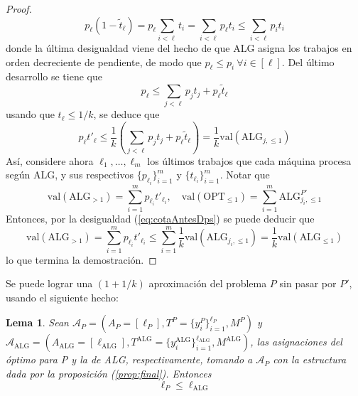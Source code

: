 \documentclass[10pt]{article}
\newcommand{\val}[1]{\text{val}(#1)}
\theoremstyle{plain}
\newtheorem{lem}{Lema}
\theoremstyle{definition}
\begin{document}
\begin{proof}
\begin{equation*}
 p_\ell(1-\tilde{t}_\ell) = p_\ell\sum_{i < \ell} t_i = \sum_{i < \ell} p_\ell t_i \leq  \sum_{i < \ell} p_i t_i
\end{equation*}
donde la última desigualdad viene del hecho de que ALG asigna los trabajos en orden decreciente de pendiente, de modo que $p_\ell \leq p_i \ \forall i \in [\ell]$. Del último desarrollo se tiene que
\begin{equation}
\label{eq:cotasGan}
p_\ell \leq \sum_{j < \ell} p_j t_j + p_\ell \tilde{t}_\ell
\end{equation}
usando que $t_\ell \leq 1/k$, se deduce que
\begin{equation}
\label{eq:cotaAntesDps}
p_\ell t'_\ell \leq \frac{1}{k}\left(\sum_{j < \ell} p_j t_j + p_\ell \tilde{t}_\ell \right) = \frac{1}{k}\val{\text{ALG}_{j,\leq 1}}
\end{equation}
Así, considere ahora $\ell_1, \ldots, \ell_m$ los \'ultimos trabajos que cada m\'aquina procesa seg\'un ALG, y sus respectivos $\{p_{\ell_i}\}_{i=1}^m$ y $\{t_{\ell_i}\}_{i=1}^m$. Notar que
$$
\val{\text{ALG}_{>1}} = \sum_{i = 1}^m p_{\ell_i}t'_{\ell_i}, \quad   \val{\text{OPT}_{\leq 1}}  = \sum_{i=1}^m \text{ALG}^{P'}_{j_i,\leq 1}  
$$
Entonces, por la desigualdad (\ref{eq:cotaAntesDps}) se puede deducir que
\begin{equation*}
\val{\text{ALG}_{>1}} = \sum_{i = 1}^m p_{\ell_i} t'_{\ell_i} \leq \sum_{i=1}^m \frac{1}{k} \val{\text{ALG}_{j_i,\leq 1}} = \frac{1}{k} \val{\text{ALG}_{\leq 1}}
\end{equation*}
lo que termina la demostración.
\end{proof}
\newpage
Se puede lograr una $(1+1/k)$ aproximación del problema $P$ sin pasar por $P'$, usando el siguiente hecho:
\begin{lem}
\label{lem:cotaell}
Sean $\mathcal{A}_P = (A_P = [\ell_P], T^P =\{y^P_i\}_{i=1}^{\ell_P},M^P)$ y $\mathcal{A}_{\text{ALG}} = (A_{\text{ALG}} = [\ell_{\text{ALG}}], T^{\text{ALG}} =\{y^{\text{ALG}}_i\}_{i=1}^{\ell_{\text{ALG}}},M^{\text{ALG}})$, las asignaciones del óptimo para P y la de ALG, respectivamente, tomando a $\mathcal{A}_P$ con la estructura dada por la proposición (\ref{prop:final}). Entonces
\begin{equation*}
\ell_P \leq \ell_{\text{ALG}}
\end{equation*}
\end{lem}
\end{document}
